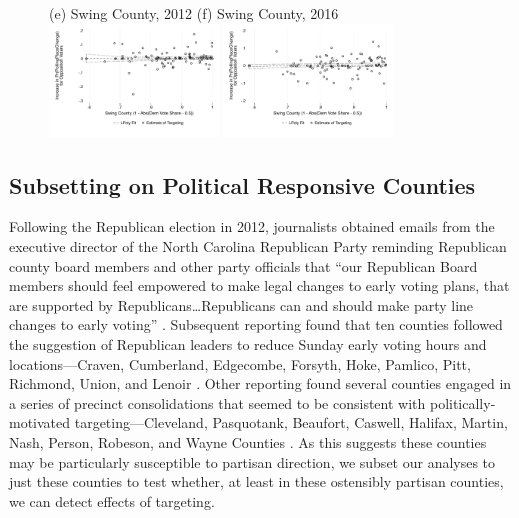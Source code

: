 \documentclass[12pt]{article}
\begin{document}
\begin{figure}[h!]
\begin{center}
		\smallskip
		(e) Swing County, 2012 \hspace*{1.5in} (f) Swing County, 2016 \\
		\smallskip
        \includegraphics[width=0.4\textwidth]{../../50_results_full/countyestimates_swing_county_2012.pdf} \includegraphics[width=0.4\textwidth]{../../50_results_full/countyestimates_swing_county_2016.pdf}
		\end{center}
\end{figure} \normalsize



\clearpage \newpage
\subsection{ Subsetting on Political Responsive Counties}\label{appendix_politically_responsive_counties}
\setcounter{table}{0}
\setcounter{figure}{0}
\renewcommand{\thetable}{G\arabic{table}}
\renewcommand{\thefigure}{G\arabic{figure}}

Following the Republican election in 2012, journalists obtained emails from the executive director of the North Carolina Republican Party reminding Republican county board members and other party officials that ``our Republican Board members should feel empowered to make legal changes to early voting plans, that are supported by Republicans\ldots Republicans can and should make party line changes to early voting'' \citep{campbell2016c}. Subsequent reporting found that ten counties followed the suggestion of Republican leaders to reduce Sunday early voting hours and locations---Craven, Cumberland, Edgecombe, Forsyth, Hoke, Pamlico, Pitt, Richmond, Union, and Lenoir \citep{campbell2016c}. Other reporting found several counties engaged in a series of precinct consolidations that seemed to be consistent with politically-motivated targeting---Cleveland, Pasquotank, Beaufort, Caswell, Halifax, Martin, Nash, Person, Robeson, and Wayne Counties \citep{ncprecincts}. As this suggests these counties may be particularly susceptible to partisan direction, we subset our analyses to just these counties to test whether, at least in these ostensibly partisan counties, we can detect effects of targeting.
\end{document}
